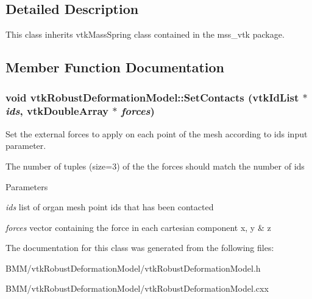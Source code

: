 \subsection{Detailed Description}
This class inherits vtkMassSpring class contained in the mss\_\-vtk package. 

\subsection{Member Function Documentation}
\hypertarget{classvtkRobustDeformationModel_a0ca4b7ead2c60259b55fdf483c022b30}{
\subsubsection[{SetContacts}]{\setlength{\rightskip}{0pt plus 5cm}void vtkRobustDeformationModel::SetContacts (vtkIdList $\ast$ {\em ids}, \/  vtkDoubleArray $\ast$ {\em forces})}}
\label{classvtkRobustDeformationModel_a0ca4b7ead2c60259b55fdf483c022b30}


Set the external forces to apply on each point of the mesh according to ids input parameter. 

The number of tuples (size=3) of the the forces should match the number of ids 
\begin{DoxyParams}{Parameters}
\item[{\em ids}]list of organ mesh point ids that has been contacted \item[{\em forces}]vector containing the force in each cartesian component x, y \& z \end{DoxyParams}


The documentation for this class was generated from the following files:\begin{DoxyCompactItemize}
\item 
BMM/vtkRobustDeformationModel/vtkRobustDeformationModel.h\item 
BMM/vtkRobustDeformationModel/vtkRobustDeformationModel.cxx\end{DoxyCompactItemize}
